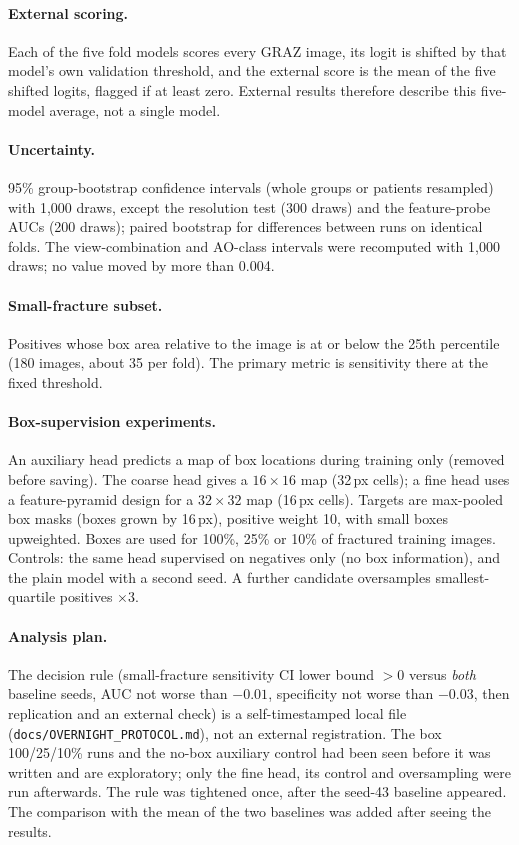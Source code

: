 \documentclass[11pt]{article}
\begin{document}
\paragraph{External scoring.} Each of the five fold models scores every GRAZ image, its logit is shifted by that model's own validation threshold, and the external score is the mean of the five shifted logits, flagged if at least zero. External results therefore describe this five-model average, not a single model.
\paragraph{Uncertainty.} 95\% group-bootstrap confidence intervals (whole groups or patients resampled) with 1,000 draws, except the resolution test (300 draws) and the feature-probe AUCs (200 draws); paired bootstrap for differences between runs on identical folds. The view-combination and AO-class intervals were recomputed with 1,000 draws; no value moved by more than 0.004.
\paragraph{Small-fracture subset.} Positives whose box area relative to the image is at or below the 25th percentile (180 images, about 35 per fold). The primary metric is sensitivity there at the fixed threshold.
\paragraph{Box-supervision experiments.} An auxiliary head predicts a map of box locations during training only (removed before saving). The coarse head gives a $16{\times}16$ map (32\,px cells); a fine head uses a feature-pyramid design for a $32{\times}32$ map (16\,px cells). Targets are max-pooled box masks (boxes grown by 16\,px), positive weight 10, with small boxes upweighted. Boxes are used for 100\%, 25\% or 10\% of fractured training images. Controls: the same head supervised on negatives only (no box information), and the plain model with a second seed. A further candidate oversamples smallest-quartile positives $\times3$.
\paragraph{Analysis plan.} The decision rule (small-fracture sensitivity CI lower bound $>0$ versus \emph{both} baseline seeds, AUC not worse than $-0.01$, specificity not worse than $-0.03$, then replication and an external check) is a self-timestamped local file (\texttt{docs/OVERNIGHT\_PROTOCOL.md}), not an external registration. The box 100/25/10\% runs and the no-box auxiliary control had been seen before it was written and are exploratory; only the fine head, its control and oversampling were run afterwards. The rule was tightened once, after the seed-43 baseline appeared. The comparison with the mean of the two baselines was added after seeing the results.
\end{document}
